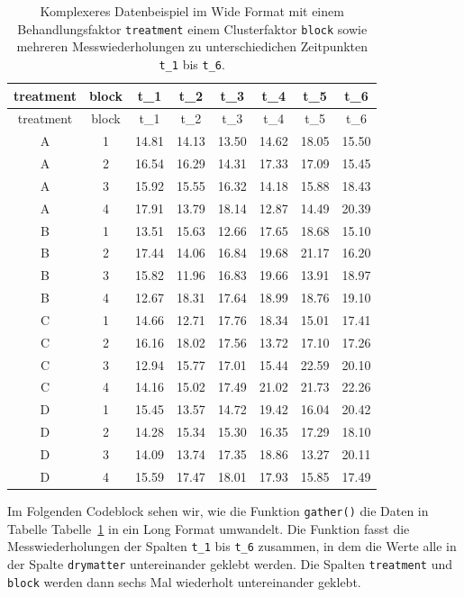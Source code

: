 \documentclass[
  letterpaper,
  DIV=11,
  oneside]{scrreport}
\begin{document}
\hypertarget{tbl-imp-complex-long}{}
\begin{longtable}[]{@{}cccccccc@{}}
\caption{\label{tbl-imp-complex-long}Komplexeres Datenbeispiel im Wide
Format mit einem Behandlungsfaktor \texttt{treatment} einem
Clusterfaktor \texttt{block} sowie mehreren Messwiederholungen zu
unterschiedichen Zeitpunkten \texttt{t\_1} bis
\texttt{t\_6}.}\tabularnewline
\toprule()
treatment & block & t\_1 & t\_2 & t\_3 & t\_4 & t\_5 & t\_6 \\
\midrule()
\endfirsthead
\toprule()
treatment & block & t\_1 & t\_2 & t\_3 & t\_4 & t\_5 & t\_6 \\
\midrule()
\endhead
A & 1 & 14.81 & 14.13 & 13.50 & 14.62 & 18.05 & 15.50 \\
A & 2 & 16.54 & 16.29 & 14.31 & 17.33 & 17.09 & 15.45 \\
A & 3 & 15.92 & 15.55 & 16.32 & 14.18 & 15.88 & 18.43 \\
A & 4 & 17.91 & 13.79 & 18.14 & 12.87 & 14.49 & 20.39 \\
B & 1 & 13.51 & 15.63 & 12.66 & 17.65 & 18.68 & 15.10 \\
B & 2 & 17.44 & 14.06 & 16.84 & 19.68 & 21.17 & 16.20 \\
B & 3 & 15.82 & 11.96 & 16.83 & 19.66 & 13.91 & 18.97 \\
B & 4 & 12.67 & 18.31 & 17.64 & 18.99 & 18.76 & 19.10 \\
C & 1 & 14.66 & 12.71 & 17.76 & 18.34 & 15.01 & 17.41 \\
C & 2 & 16.16 & 18.02 & 17.56 & 13.72 & 17.10 & 17.26 \\
C & 3 & 12.94 & 15.77 & 17.01 & 15.44 & 22.59 & 20.10 \\
C & 4 & 14.16 & 15.02 & 17.49 & 21.02 & 21.73 & 22.26 \\
D & 1 & 15.45 & 13.57 & 14.72 & 19.42 & 16.04 & 20.42 \\
D & 2 & 14.28 & 15.34 & 15.30 & 16.35 & 17.29 & 18.10 \\
D & 3 & 14.09 & 13.74 & 17.35 & 18.86 & 13.27 & 20.11 \\
D & 4 & 15.59 & 17.47 & 18.01 & 17.93 & 15.85 & 17.49 \\
\bottomrule()
\end{longtable}

Im Folgenden Codeblock sehen wir, wie die Funktion \texttt{gather()} die
Daten in Tabelle Tabelle~\ref{tbl-imp-complex-long} in ein Long Format
umwandelt. Die Funktion fasst die Messwiederholungen der Spalten
\texttt{t\_1} bis \texttt{t\_6} zusammen, in dem die Werte alle in der
Spalte \texttt{drymatter} untereinander geklebt werden. Die Spalten
\texttt{treatment} und \texttt{block} werden dann sechs Mal wiederholt
untereinander geklebt.
\end{document}
